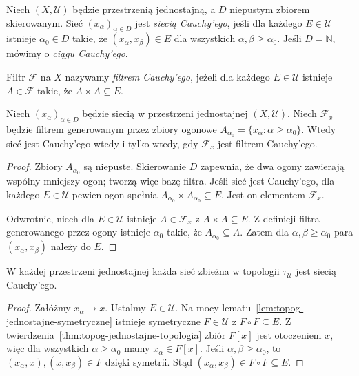 \begin{definicja}
\label{def:topog-jednostajne-siec-cauchyego}
Niech $(X,\mathcal U)$ będzie przestrzenią
jednostajną, a $D$ niepustym zbiorem skierowanym.
Sieć $(x_\alpha)_{\alpha\in D}$ jest
\emph{siecią Cauchy'ego}, jeśli dla każdego
$E\in\mathcal U$ istnieje $\alpha_0\in D$
takie, że $(x_\alpha,x_\beta)\in E$
dla wszystkich $\alpha,\beta\ge\alpha_0$.
Jeśli $D=\mathbb N$, mówimy o \emph{ciągu Cauchy'ego}.
\end{definicja}

\begin{definicja}
\label{def:topog-jednostajne-filtr-cauchyego}
Filtr $\mathcal F$ na $X$ nazywamy
\emph{filtrem Cauchy'ego}, jeżeli
dla każdego $E\in\mathcal U$ istnieje
$A\in\mathcal F$ takie, że $A\times A\subseteq E$.
\end{definicja}

\begin{twierdzenie}
\label{thm:topog-jednostajne-ogony}
Niech $(x_\alpha)_{\alpha\in D}$ będzie
siecią w przestrzeni jednostajnej $(X,\mathcal U)$.
Niech $\mathcal F_x$ będzie filtrem
generowanym przez zbiory ogonowe
$A_{\alpha_0}=\{x_\alpha:\alpha\ge\alpha_0\}$.
Wtedy sieć jest Cauchy'ego wtedy i tylko wtedy,
gdy $\mathcal F_x$ jest filtrem Cauchy'ego.
\end{twierdzenie}
\begin{proof}
Zbiory $A_{\alpha_0}$ są niepuste.
Skierowanie $D$ zapewnia, że dwa ogony
zawierają wspólny mniejszy ogon;
tworzą więc bazę filtra.
Jeśli sieć jest Cauchy'ego, dla każdego
$E\in\mathcal U$ pewien ogon spełnia
$A_{\alpha_0}\times A_{\alpha_0}\subseteq E$.
Jest on elementem $\mathcal F_x$.

Odwrotnie, niech dla $E\in\mathcal U$
istnieje $A\in\mathcal F_x$ z
$A\times A\subseteq E$. Z definicji
filtra generowanego przez ogony istnieje
$\alpha_0$ takie, że $A_{\alpha_0}\subseteq A$.
Zatem dla $\alpha,\beta\ge\alpha_0$
para $(x_\alpha,x_\beta)$ należy do $E$.
\end{proof}

\begin{twierdzenie}
\label{thm:topog-jednostajne-zbiezna-cauchy}
W każdej przestrzeni jednostajnej
każda sieć zbieżna w topologii
$\tau_{\mathcal U}$ jest siecią Cauchy'ego.
\end{twierdzenie}
\begin{proof}
Załóżmy $x_\alpha\to x$. Ustalmy
$E\in\mathcal U$. Na mocy
lematu~\ref{lem:topog-jednostajne-symetryczne}
istnieje symetryczne $F\in\mathcal U$
z $F\circ F\subseteq E$.
Z twierdzenia~\ref{thm:topog-jednostajne-topologia}
zbiór $F[x]$ jest otoczeniem $x$,
więc dla wszystkich $\alpha\ge\alpha_0$
mamy $x_\alpha\in F[x]$.
Jeśli $\alpha,\beta\ge\alpha_0$, to
$(x_\alpha,x),(x,x_\beta)\in F$
dzięki symetrii. Stąd
$(x_\alpha,x_\beta)\in F\circ F\subseteq E$.
\end{proof}

